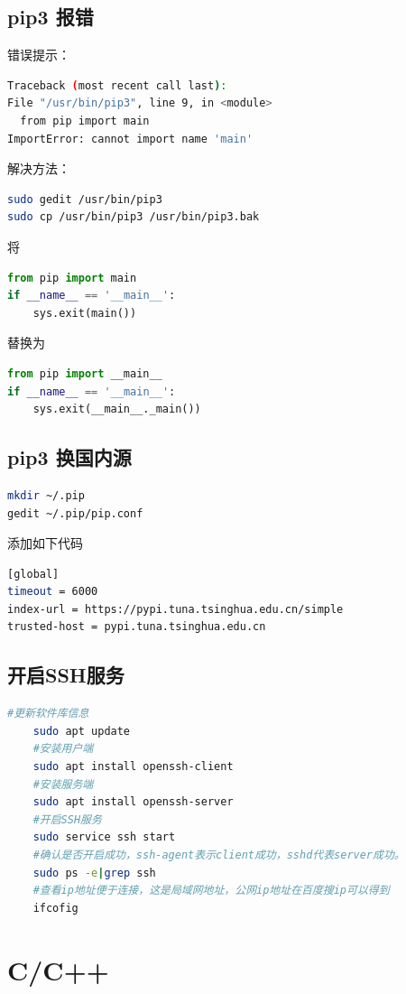 \documentclass[12pt,twoside]{report}
\begin{document}
\section{pip3 报错}
\noindent 错误提示：
\begin{lstlisting}[language=sh]
Traceback (most recent call last):
File "/usr/bin/pip3", line 9, in <module>
  from pip import main
ImportError: cannot import name 'main'  
\end{lstlisting}
解决方法：
\begin{lstlisting}[language=sh]
sudo gedit /usr/bin/pip3
sudo cp /usr/bin/pip3 /usr/bin/pip3.bak
\end{lstlisting}
将
\begin{lstlisting}[language=python]
from pip import main
if __name__ == '__main__':
    sys.exit(main())
\end{lstlisting}
替换为
\begin{lstlisting}[language=python]
from pip import __main__
if __name__ == '__main__':
    sys.exit(__main__._main())
\end{lstlisting}

\section{pip3 换国内源}
\begin{lstlisting}[language=sh]
mkdir ~/.pip
gedit ~/.pip/pip.conf
\end{lstlisting}

添加如下代码
\begin{lstlisting}[language=sh]
[global]
timeout = 6000
index-url = https://pypi.tuna.tsinghua.edu.cn/simple
trusted-host = pypi.tuna.tsinghua.edu.cn
\end{lstlisting}

\section{开启SSH服务}
\begin{lstlisting}[language=sh]
    #更新软件库信息
    sudo apt update
    #安装用户端
    sudo apt install openssh-client
    #安装服务端
    sudo apt install openssh-server
    #开启SSH服务
    sudo service ssh start
    #确认是否开启成功，ssh-agent表示client成功，sshd代表server成功。
    sudo ps -e|grep ssh
    #查看ip地址便于连接，这是局域网地址，公网ip地址在百度搜ip可以得到
    ifcofig
\end{lstlisting}

\chapter{C/C++}
\end{document}
